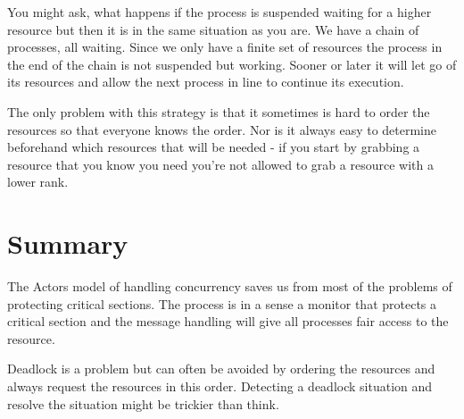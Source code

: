 \documentclass[a4paper,11pt]{article}
\begin{document}
You might ask, what happens if the process is suspended waiting for a
higher resource but then it is in the same situation as you are. We
have a chain of processes, all waiting. Since we only have a finite
set of resources the process in the end of the chain is not suspended
but working. Sooner or later it will let go of its resources and allow
the next process in line to continue its execution.

The only problem with this strategy is that it sometimes is hard to
order the resources so that everyone knows the order. Nor is it always
easy to determine beforehand which resources that will be needed - if
you start by grabbing a resource that you know you need you're not
allowed to grab a resource with a lower rank.




\section{Summary}

The Actors model of handling concurrency saves us from most of the
problems of protecting critical sections. The process is in a sense a
monitor that protects a critical section and the message handling will
give all processes fair access to the resource.

Deadlock is a problem but can often be avoided by ordering the
resources and always request the resources in this order. Detecting a
deadlock situation and resolve the situation might be trickier than
think. 
\end{document}
